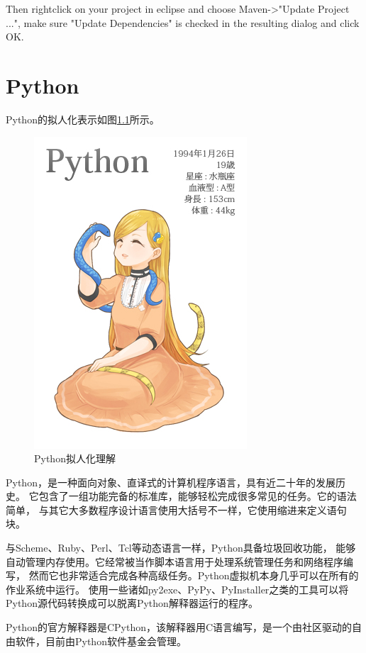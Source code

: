 \documentclass{book}
\begin{document}
Then rightclick on your project in eclipse and choose Maven->"Update Project ...", 
make sure "Update Dependencies" is checked in the resulting dialog and click OK.

\chapter{Python}

Python的拟人化表示如图\ref{code:PythonVirtual}所示。

\begin{figure}[htbp]
	\centering
	\includegraphics[scale=0.6]{PythonVirtual.jpg}
	\caption{Python拟人化理解}
	\label{code:PythonVirtual}
\end{figure}

Python，是一种面向对象、直译式的计算机程序语言，具有近二十年的发展历史。
它包含了一组功能完备的标准库，能够轻松完成很多常见的任务。它的语法简单，
与其它大多数程序设计语言使用大括号不一样，它使用缩进来定义语句块。

与Scheme、Ruby、Perl、Tcl等动态语言一样，Python具备垃圾回收功能，
能够自动管理内存使用。它经常被当作脚本语言用于处理系统管理任务和网络程序编写，
然而它也非常适合完成各种高级任务。Python虚拟机本身几乎可以在所有的作业系统中运行。
使用一些诸如py2exe、PyPy、PyInstaller之类的工具可以将Python源代码转换成可以脱离Python解释器运行的程序。

Python的官方解释器是CPython，该解释器用C语言编写，是一个由社区驱动的自由软件，目前由Python软件基金会管理。
\end{document}

